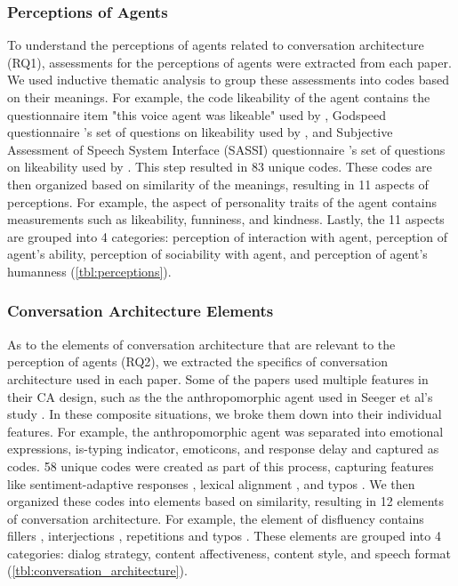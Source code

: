 \subsubsection*{Perceptions of Agents} To understand the perceptions of agents related to conversation architecture (RQ1), assessments for the perceptions of agents were extracted from each paper. We used inductive thematic analysis to group these assessments into codes based on their meanings. For example, the code likeability of the agent contains the questionnaire item "this voice agent was likeable" used by \cite{cuadra2021my}\cmt{[67]}, Godspeed questionnaire \cite{bartneck2009measurement}'s set of questions on likeability used by \cite{linnemann2018can}\cmt{[15]}, and Subjective Assessment of Speech System Interface (SASSI) questionnaire \cite{hone2000towards}'s set of questions on likeability used by \cite{chan2021kinvoices, choi2020nobody}\cmt{[74][54]}. This step resulted in 83 unique codes. These codes are then organized based on similarity of the meanings, resulting in 11 aspects of perceptions. For example, the aspect of personality traits of the agent contains measurements such as likeability, funniness, and kindness. Lastly, the 11 aspects are grouped into 4 categories: perception of interaction with agent, perception of agent's ability, perception of sociability with agent, and perception of agent's humanness (\autoref{tbl:perceptions}).

\subsubsection*{Conversation Architecture Elements}
As to the elements of conversation architecture that are relevant to the perception of agents (RQ2), we extracted the specifics of conversation architecture used in each paper. Some of the papers used multiple features in their CA design, such as the the anthropomorphic agent used in Seeger et al's study \cite{seeger2021chatbots}\cmt{[35]}. In these composite situations, we broke them down into their individual features. For example, the anthropomorphic agent \cite{seeger2021chatbots}\cmt{[35]} was separated into emotional expressions, is-typing indicator, emoticons, and response delay and captured as codes. 58 unique codes were created as part of this process, capturing features like sentiment-adaptive responses \cite{diederich2019emulating}\cmt{[25]}, lexical alignment \cite{spillner2021talk}\cmt{[18]}, and typos \cite{westerman2019believe}\cmt{[9]}. We then organized these codes into elements based on similarity, resulting in 12 elements of conversation architecture. For example, the element of disfluency contains fillers \cite{jeong2019exploring, wester2015artificial}\cmt{[10][14]}, interjections \cite{ceha2022expressive, hu2021enhancing}\cmt{[77][56]}, repetitions \cite{yang2021effect}\cmt{[72]} and typos \cite{westerman2019believe}\cmt{[9]}. These elements are grouped into 4 categories: dialog strategy, content affectiveness, content style, and speech format (\autoref{tbl:conversation_architecture}).

